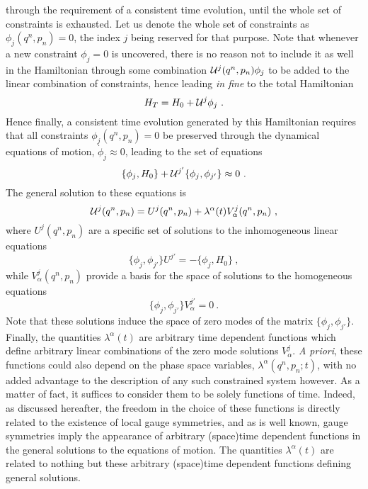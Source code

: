 \documentclass[a4paper,11pt]{article}
\begin{document}
through the requirement of a consistent time evolution, until the whole set 
of constraints is exhausted. Let us denote the whole set of constraints as 
$\phi_j(q^n,p_n)=0$, the index $j$ being reserved for that purpose. Note 
that whenever a new constraint $\phi_j=0$ is uncovered, there is no reason 
not to include it as well in the Hamiltonian through some combination 
${\cal U}^j(q^n,p_n)\phi_j$ to be added to the linear combination of 
constraints, hence leading {\sl in fine\/} to the total Hamiltonian
\begin{equation}
H_T=H_0+{\cal U}^j\phi_j\ .
\end{equation}
Hence finally, a consistent time evolution generated by this Hamiltonian
requires that all constraints $\phi_j(q^n,p_n)=0$ be preserved through
the dynamical equations of motion, $\dot{\phi}_j\approx 0$, leading to the 
set of equations
\begin{equation}
\{\phi_j,H_0\}+{\cal U}^{j'}\{\phi_j,\phi_{j'}\}\approx 0\ .
\end{equation}
The general solution to these equations is
\begin{equation}
{\cal U}^j(q^n,p_n)=U^j(q^n,p_n)+\lambda^\alpha(t)V^j_\alpha(q^n,p_n)\ ,
\end{equation}
where $U^j(q^n,p_n)$ are a specific set of solutions to the inhomogeneous 
linear equations
\begin{equation}
\{\phi_j,\phi_{j'}\}U^{j'}=-\{\phi_j,H_0\}\ ,
\end{equation}
while $V^j_\alpha(q^n,p_n)$ provide a basis for the space of solutions to
the homogeneous equations
\begin{equation}
\{\phi_j,\phi_{j'}\}V^{j'}_\alpha=0\ .
\end{equation}
Note that these solutions induce the space of zero modes of the matrix
$\{\phi_j,\phi_{j'}\}$. Finally, the quantities $\lambda^\alpha(t)$ are
arbitrary time dependent functions which define arbitrary linear combinations
of the zero mode solutions $V^j_\alpha$. {\sl A priori\/}, these functions
could also depend on the phase space variables, $\lambda^\alpha(q^n,p_n;t)$,
with no added advantage to the description of any such constrained
system however. As a matter of fact, it suffices to consider them to be
solely functions of time. Indeed, as discussed hereafter, the freedom in the
choice of these functions is directly related to the existence of local
gauge symmetries, and as is well known, gauge symmetries imply the
appearance of arbitrary (space)time dependent functions in the general
solutions to the equations of motion. The quantities $\lambda^\alpha(t)$
are related to nothing but these arbitrary (space)time dependent functions 
defining general solutions.
\end{document}

